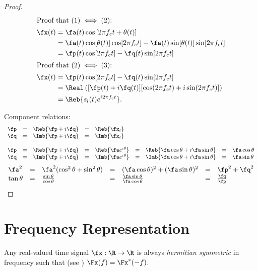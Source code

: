 \begin{proof}

\begin{align*}
  \intertext{Proof that $(1) \iff (2)$: }
   \fx(t)
     &= \fa(t)\cos\left[ 2\pi f_c t + \theta(t) \right]
   \\&= \fa(t)\cos[\theta(t)]\cos[2\pi f_c t] -\fa(t)\sin[\theta(t)]\sin[2\pi f_c t]
   \\&= \fp(t)\cos[2\pi f_c t] -\fq(t)\sin[2\pi f_c t]
  \\
  \intertext{Proof that $(2) \iff (3)$: }
  \fx(t)
    &= \fp(t)\cos[2\pi f_c t] -\fq(t)\sin[2\pi f_c t]
  \\&= \Real\left( [\fp(t)+i\fq(t)][\cos(2\pi f_c t) + i\sin(2\pi f_c t)]\right)
  \\&= \Reb{s_l(t)e^{i2\pi f_c t}}.
\end{align*}

Component relations:
\[\begin{array}{*{12}{l}}
   \fp
     &=& \Reb{\fp + i\fq}
     &=& \Reb{\fx_l}
\\
   \fq
     &=& \Imb{\fp + i\fq}
     &=& \Imb{\fx_l}
\\ \\
   \fp
     &=& \Reb{\fp + i\fq}
     &=& \Reb{\fa e^{i\theta}}
     &=& \Reb{\fa\cos\theta + i\fa\sin\theta}
     &=& \fa\cos\theta
\\
   \fq
     &=& \Imb{\fp + i\fq}
     &=& \Imb{\fa e^{i\theta}}
     &=& \Imb{\fa\cos\theta + i\fa\sin\theta}
     &=& \fa\sin\theta
\end{array}\]
\[\begin{array}{*{12}{l}}
   \fa^2
     &=& \fa^2 (\cos^2\theta + \sin^2\theta)
     &=& (\fa \cos\theta)^2 + (\fa\sin\theta)^2
     &=& \fp^2 + \fq^2
\\
   \tan\theta
     &=& \frac{\sin\theta}{\cos\theta}
     &=& \frac{\fa\sin\theta}{\fa\cos\theta}
     &=& \frac{\fq}{\fp}
\end{array}\]

\end{proof}


\section{Frequency Representation}
Any real-valued time signal $\fx:\R\to\R$
is always {\em hermitian symmetric} in frequency
such that (see )
$\Fx(f) =  \Fx^\ast(-f)$.


